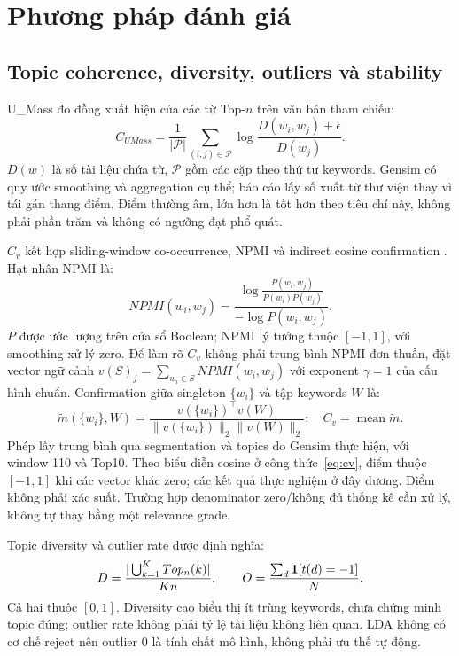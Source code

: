 \section{Phương pháp đánh giá}\label{sec:metrics}
\subsection{Topic coherence, diversity, outliers và stability}
U\_Mass đo đồng xuất hiện của các từ Top-$n$ trên văn bản tham chiếu:
\begin{equation}\label{eq:umass}
C_{UMass}=\frac1{|\mathcal P|}\sum_{(i,j)\in\mathcal P}
\log\frac{D(w_i,w_j)+\epsilon}{D(w_j)}.
\end{equation}
$D(w)$ là số tài liệu chứa từ, $\mathcal P$ gồm các cặp theo thứ tự keywords. Gensim có quy ước smoothing và aggregation cụ thể; báo cáo lấy số xuất từ thư viện thay vì tái gán thang điểm. Điểm thường âm, lớn hơn là tốt hơn theo tiêu chí này, không phải phần trăm và không có ngưỡng đạt phổ quát.

$C_v$ kết hợp sliding-window co-occurrence, NPMI và indirect cosine confirmation \cite{coherence}. Hạt nhân NPMI là:
\begin{equation}\label{eq:npmi}
NPMI(w_i,w_j)=\frac{\log\frac{P(w_i,w_j)}{P(w_i)P(w_j)}}{-\log P(w_i,w_j)}.
\end{equation}
$P$ được ước lượng trên cửa sổ Boolean; NPMI lý tưởng thuộc $[-1,1]$, với smoothing xử lý zero. Để làm rõ $C_v$ không phải trung bình NPMI đơn thuần, đặt vector ngữ cảnh $v(S)_j=\sum_{w_i\in S}NPMI(w_i,w_j)$ với exponent $\gamma=1$ của cấu hình chuẩn. Confirmation giữa singleton $\{w_i\}$ và tập keywords $W$ là:
\begin{equation}\label{eq:cv}
\widetilde m(\{w_i\},W)=\frac{v(\{w_i\})^\top v(W)}{\|v(\{w_i\})\|_2\|v(W)\|_2};\quad C_v=\operatorname{mean}\widetilde m.
\end{equation}
Phép lấy trung bình qua segmentation và topics do Gensim thực hiện, với window 110 và Top10. Theo biểu diễn cosine ở công thức~\eqref{eq:cv}, điểm thuộc $[-1,1]$ khi các vector khác zero; các kết quả thực nghiệm ở đây dương. Điểm không phải xác suất. Trường hợp denominator zero/không đủ thống kê cần xử lý, không tự thay bằng một relevance grade.

Topic diversity và outlier rate được định nghĩa:
\begin{equation}\label{eq:diversity}
D=\frac{|\bigcup_{k=1}^{K}Top_n(k)|}{Kn},\qquad
O=\frac{\sum_d\mathbf{1}[t(d)=-1]}{N}.
\end{equation}
Cả hai thuộc $[0,1]$. Diversity cao biểu thị ít trùng keywords, chưa chứng minh topic đúng; outlier rate không phải tỷ lệ tài liệu không liên quan. LDA không có cơ chế reject nên outlier 0 là tính chất mô hình, không phải ưu thế tự động.

